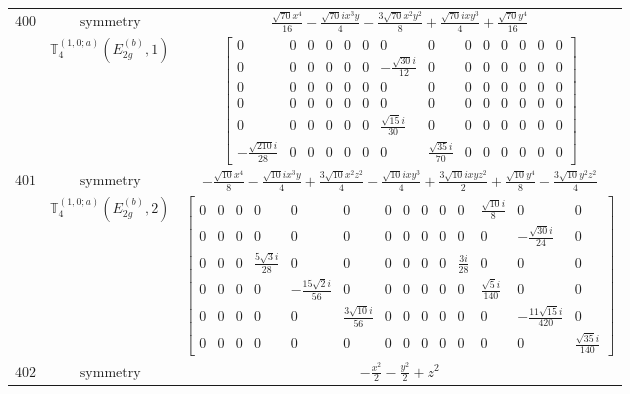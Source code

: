 \documentclass[fleqn,8pt,landscape]{jsarticle}
\begin{document}
\begin{longtable}{ccc}
$ 400 $ & $ \text{symmetry} $ & $ \frac{\sqrt{70} x^{4}}{16} - \frac{\sqrt{70} i x^{3} y}{4} - \frac{3 \sqrt{70} x^{2} y^{2}}{8} + \frac{\sqrt{70} i x y^{3}}{4} + \frac{\sqrt{70} y^{4}}{16} $ \\
$  $ & $ \mathbb{T}_{4}^{(1,0;a)}(E_{2g}^{(b)},1) $ & $ \begin{bmatrix} 0 & 0 & 0 & 0 & 0 & 0 & 0 & 0 & 0 & 0 & 0 & 0 & 0 & 0 \\ 0 & 0 & 0 & 0 & 0 & 0 & - \frac{\sqrt{30} i}{12} & 0 & 0 & 0 & 0 & 0 & 0 & 0 \\ 0 & 0 & 0 & 0 & 0 & 0 & 0 & 0 & 0 & 0 & 0 & 0 & 0 & 0 \\ 0 & 0 & 0 & 0 & 0 & 0 & 0 & 0 & 0 & 0 & 0 & 0 & 0 & 0 \\ 0 & 0 & 0 & 0 & 0 & 0 & \frac{\sqrt{15} i}{30} & 0 & 0 & 0 & 0 & 0 & 0 & 0 \\ - \frac{\sqrt{210} i}{28} & 0 & 0 & 0 & 0 & 0 & 0 & \frac{\sqrt{35} i}{70} & 0 & 0 & 0 & 0 & 0 & 0 \end{bmatrix} $ \\ \hline
$ 401 $ & $ \text{symmetry} $ & $ - \frac{\sqrt{10} x^{4}}{8} - \frac{\sqrt{10} i x^{3} y}{4} + \frac{3 \sqrt{10} x^{2} z^{2}}{4} - \frac{\sqrt{10} i x y^{3}}{4} + \frac{3 \sqrt{10} i x y z^{2}}{2} + \frac{\sqrt{10} y^{4}}{8} - \frac{3 \sqrt{10} y^{2} z^{2}}{4} $ \\
$  $ & $ \mathbb{T}_{4}^{(1,0;a)}(E_{2g}^{(b)},2) $ & $ \begin{bmatrix} 0 & 0 & 0 & 0 & 0 & 0 & 0 & 0 & 0 & 0 & 0 & \frac{\sqrt{10} i}{8} & 0 & 0 \\ 0 & 0 & 0 & 0 & 0 & 0 & 0 & 0 & 0 & 0 & 0 & 0 & - \frac{\sqrt{30} i}{24} & 0 \\ 0 & 0 & 0 & \frac{5 \sqrt{3} i}{28} & 0 & 0 & 0 & 0 & 0 & 0 & \frac{3 i}{28} & 0 & 0 & 0 \\ 0 & 0 & 0 & 0 & - \frac{15 \sqrt{2} i}{56} & 0 & 0 & 0 & 0 & 0 & 0 & \frac{\sqrt{5} i}{140} & 0 & 0 \\ 0 & 0 & 0 & 0 & 0 & \frac{3 \sqrt{10} i}{56} & 0 & 0 & 0 & 0 & 0 & 0 & - \frac{11 \sqrt{15} i}{420} & 0 \\ 0 & 0 & 0 & 0 & 0 & 0 & 0 & 0 & 0 & 0 & 0 & 0 & 0 & \frac{\sqrt{35} i}{140} \end{bmatrix} $ \\ \hline
$ 402 $ & $ \text{symmetry} $ & $ - \frac{x^{2}}{2} - \frac{y^{2}}{2} + z^{2} $ \\

\end{longtable}
\end{document}

